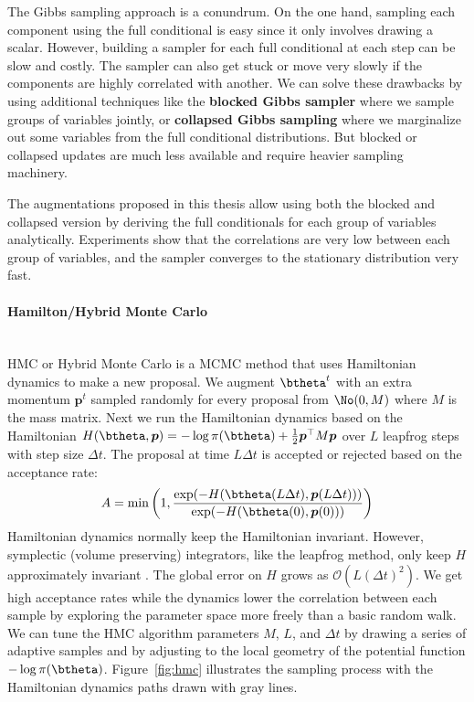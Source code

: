 The Gibbs sampling approach is a conundrum.
On the one hand, sampling each component using the full conditional is easy since it only involves drawing a scalar.
However, building a sampler for each full conditional at each step can be slow and costly.
The sampler can also get stuck or move very slowly if the components are highly correlated with another.
We can solve these drawbacks by using additional techniques like the \textbf{blocked Gibbs sampler} \cite{jensen1995blocking} where we sample groups of variables jointly, or \textbf{collapsed Gibbs sampling} \cite{liu1994collapsed} where we marginalize out some variables from the full conditional distributions.
But blocked or collapsed updates are much less available and require heavier sampling machinery.

The augmentations proposed in this thesis allow using both the blocked and collapsed version by deriving the full conditionals for each group of variables analytically.
Experiments show that the correlations are very low between each group of variables, and the sampler converges to the stationary distribution very fast.


\paragraph{Hamilton/Hybrid Monte Carlo}\mbox{}\\
\label{sec:hmc}
\acf{HMC} or Hybrid Monte Carlo \cite{duane1987hybrid, neal2011mcmc, betancourt2017conceptual} is a \ac{MCMC} method that uses Hamiltonian dynamics to make a new proposal.
We augment $\btheta^t$ with an extra momentum $\boldsymbol{p}^t$ sampled randomly for every proposal from $\No(0,M)$ where $M$ is the mass matrix.
Next we run the Hamiltonian dynamics based on the Hamiltonian $H(\btheta, \boldsymbol{p}) = -\log \pi(\btheta) + \frac{1}{2}\boldsymbol{p}^\top M \boldsymbol{p}$ over $L$ leapfrog steps with step size $\Delta t$.
The proposal at time $L\Delta t$ is accepted or rejected based on the acceptance rate:
\begin{align*}
    A = \min\left(1, \frac{\exp(-H(\btheta(L\Delta t), \boldsymbol{p}(L\Delta t)))}{\exp(-H(\btheta(0), \boldsymbol{p}(0)))}\right)
\end{align*}
Hamiltonian dynamics normally keep the Hamiltonian invariant.
However, symplectic (volume preserving) integrators, like the leapfrog method, only keep $H$ approximately invariant \cite{neal2011mcmc}.
The global error on $H$ grows as $\mathcal{O}(L(\Delta t)^2)$.
We get high acceptance rates while the dynamics lower the correlation between each sample by exploring the parameter space more freely than a basic random walk.
We can tune the \ac{HMC} algorithm parameters $M$, $L$, and $\Delta t$ by drawing a series of adaptive samples and by adjusting to the local geometry of the potential function $-\log\pi(\btheta)$.
Figure~\ref{fig:hmc} illustrates the sampling process with the Hamiltonian dynamics paths drawn with gray lines.


